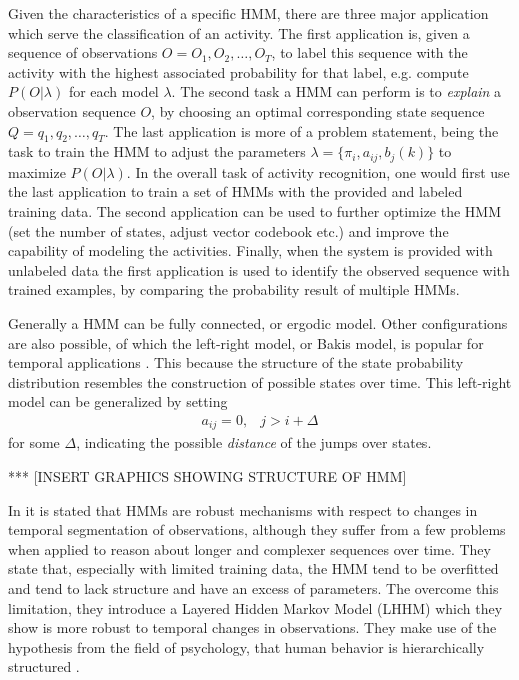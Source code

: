 Given the characteristics of a specific HMM, there are three major application 
which serve the classification of an activity. The first application is, given 
a sequence of observations $O = O_1,O_2,\dots,O_T$, to label this sequence 
with the activity with 
the highest associated probability for that label, e.g. compute $P(O|\lambda)$ 
for each model $\lambda$. The second task a HMM can perform is to 
\emph{explain} a observation sequence $O$, by choosing an optimal 
corresponding state sequence $Q = q_1,q_2,\dots,q_T$. The last application is 
more of a problem statement, being the task to train the HMM to adjust the 
parameters $\lambda = \{ \pi_i, a_{ij}, b_j(k)\}$ to maximize $P(O|\lambda)$. 
In the overall task of activity recognition, one would first use the last 
application to train a set of HMMs with the provided and labeled training 
data. The second application can be used to further optimize the HMM (set the 
number of states, adjust vector codebook etc.) and improve the capability of 
modeling the activities. Finally, when the system is provided with unlabeled 
data the first application is used to identify the observed sequence with 
trained examples, by comparing the probability result of multiple HMMs.

Generally a HMM can be fully connected, or ergodic model. Other configurations 
are also possible, of which the left-right model, or Bakis model, is popular 
for temporal applications \cite{rabiner1989tutorial}. This because the 
structure of the state probability distribution resembles the construction of 
possible states over time. This left-right model can be generalized by setting
\begin{eqnarray}
a_{ij} = 0, & j > i + \Delta
\end{eqnarray}
for some $\Delta$, indicating the possible \emph{distance} of the jumps over 
states.

*** [INSERT GRAPHICS SHOWING STRUCTURE OF HMM]

In \cite{oliver2002layered} it is stated that HMMs are robust mechanisms with 
respect to changes in temporal segmentation of observations, although they 
suffer from a few problems when applied to reason about longer and complexer 
sequences over time. They state that, especially with limited training data, 
the HMM tend to be overfitted and tend to lack structure and have an excess of 
parameters. The overcome this limitation, they introduce a Layered Hidden 
Markov Model (LHHM) which they show is more robust to temporal changes in 
observations. They make use of the hypothesis from the field of psychology, 
that human behavior is hierarchically structured \cite{zacks2001event}.



